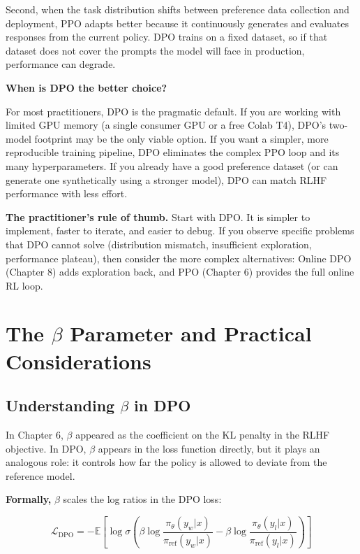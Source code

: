 \begin{chapterenv}
Second, when the task distribution shifts between preference data collection and deployment, PPO adapts better because it continuously generates and evaluates responses from the current policy. DPO trains on a fixed dataset, so if that dataset does not cover the prompts the model will face in production, performance can degrade.

\textbf{When is DPO the better choice?}

For most practitioners, DPO is the pragmatic default. If you are working with limited GPU memory (a single consumer GPU or a free Colab T4), DPO's two-model footprint may be the only viable option. If you want a simpler, more reproducible training pipeline, DPO eliminates the complex PPO loop and its many hyperparameters. If you already have a good preference dataset (or can generate one synthetically using a stronger model), DPO can match RLHF performance with less effort.

\begin{tipbox}
\textbf{The practitioner's rule of thumb.} Start with DPO. It is simpler to implement, faster to iterate, and easier to debug. If you observe specific problems that DPO cannot solve (distribution mismatch, insufficient exploration, performance plateau), then consider the more complex alternatives: Online DPO (Chapter 8) adds exploration back, and PPO (Chapter 6) provides the full online RL loop.
\end{tipbox}

\pagebreak[3]
\section{The $\beta$ Parameter and Practical Considerations}

\subsection{Understanding $\beta$ in DPO}

In Chapter 6, $\beta$ appeared as the coefficient on the KL penalty in the RLHF objective. In DPO, $\beta$ appears in the loss function directly, but it plays an analogous role: it controls how far the policy is allowed to deviate from the reference model.

\textbf{Formally,} $\beta$ scales the log ratios in the DPO loss:

$$\mathcal{L}_{\text{DPO}} = -\mathbb{E}\!\left[\log \sigma\!\left(\beta \log \frac{\pi_\theta(y_w|x)}{\pi_{\text{ref}}(y_w|x)} - \beta \log \frac{\pi_\theta(y_l|x)}{\pi_{\text{ref}}(y_l|x)}\right)\right]$$


\end{chapterenv}
